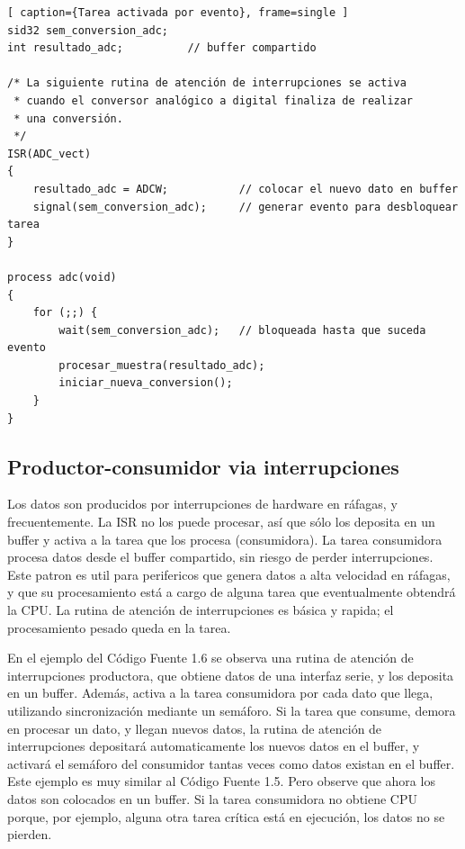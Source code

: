 \documentclass[output=paper, 
colorlinks,
citecolor=brown,
newtxmath
]{langscibook}
\begin{document}
\begin{lstlisting}[ caption={Tarea activada por evento}, frame=single ]
sid32 sem_conversion_adc;
int resultado_adc;		    // buffer compartido

/* La siguiente rutina de atención de interrupciones se activa
 * cuando el conversor analógico a digital finaliza de realizar
 * una conversión.
 */
ISR(ADC_vect) 
{
    resultado_adc = ADCW;           // colocar el nuevo dato en buffer
    signal(sem_conversion_adc);     // generar evento para desbloquear tarea
}

process adc(void) 
{
    for (;;) {
        wait(sem_conversion_adc);   // bloqueada hasta que suceda evento
        procesar_muestra(resultado_adc);
        iniciar_nueva_conversion();
    }
}
\end{lstlisting}


\subsection{Productor-consumidor via interrupciones}
Los datos son producidos por interrupciones de hardware en ráfagas, y frecuentemente.  La ISR no los puede procesar, así que sólo los deposita en un buffer y 
activa a la tarea que los procesa (consumidora). La tarea consumidora procesa 
datos desde el buffer compartido, sin riesgo de perder interrupciones. 
Este patron es util para perifericos que genera datos a alta velocidad en 
ráfagas, y que su procesamiento está a cargo de alguna tarea que eventualmente
obtendrá la CPU. La rutina de atención de interrupciones es básica y rapida; el procesamiento pesado queda en la tarea. 

En el ejemplo del Código Fuente 1.6 se observa una rutina de atención de 
interrupciones productora, que obtiene datos de una interfaz serie,
y los deposita en un buffer. Además, activa a la tarea consumidora
por cada dato que llega, utilizando sincronización mediante un 
semáforo.  Si la tarea que consume, demora en procesar
un dato, y llegan nuevos datos, la rutina de atención de interrupciones
depositará automaticamente los nuevos datos en el buffer, y activará
el semáforo del consumidor tantas veces como datos existan en el buffer.
Este ejemplo es muy similar al Código Fuente 1.5. Pero observe que ahora
los datos son colocados en un buffer. Si la tarea consumidora no obtiene
CPU porque, por ejemplo, alguna otra tarea crítica está en ejecución,
los datos no se pierden.
\end{document}
